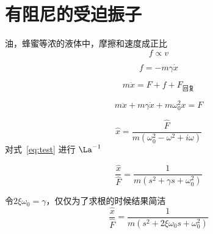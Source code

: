 
\section{有阻尼的受迫振子}%
油，蜂蜜等浓的液体中，摩擦和速度成正比
\begin{equation*}
	f \propto v
\end{equation*}

\begin{equation*}
	f = -m \gamma \dot{x}
\end{equation*}

\begin{equation*}
	m \ddot{x} = F + f + F_{\text{回复}}
\end{equation*}

\begin{equation}
	m \ddot{x} + m \gamma \dot{x} + m \omega_0^2 x = F
	\label{eq:test}
\end{equation}

\begin{equation*}
	\hat{x} = \frac{\hat{F}}{m(\omega_0^2 - \omega^2 + i \omega)}
\end{equation*}
对式~\eqref{eq:test} 进行 \(\La^{-1}\)

\begin{equation*}
	\frac{\hat{x}}{\hat{F}} = \frac{1}{ m ( s^2 +\gamma s + \omega_0^2 ) }
\end{equation*}

令\( 2 \xi \omega_0 = \gamma \)，仅仅为了求根的时候结果简洁
\begin{equation*}
	\frac{\hat{x}}{\hat{F}} = \frac{1}{ m ( s^2 + 2 \xi \omega_0 s + \omega_0^2 ) }
\end{equation*}

